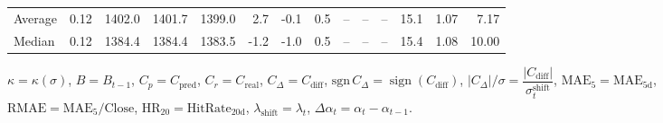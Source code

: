 \begin{threeparttable}
{\begin{tabular}{lrrrrrrrrrrrrr}
Average &     0.12 & 1402.0 & 1401.7 & 1399.0 &        2.7 &                     -0.1 &                 0.5 &         -- &        -- &             -- &             15.1 &            1.07 &                   7.17 \\
 Median &     0.12 & 1384.4 & 1384.4 & 1383.5 &       -1.2 &                     -1.0 &                 0.5 &         -- &        -- &             -- &             15.4 &            1.08 &                  10.00 \\
\bottomrule
\end{tabular}
}
\begin{tablenotes}\footnotesize
\item $\kappa=\kappa(\sigma)$, $B=B_{t-1}$, $C_p=C_{\text{pred}}$, $C_r=C_{\text{real}}$, $C_\Delta=C_{\text{diff}}$, $\mathrm{sgn}\,C_\Delta=\operatorname{sign}(C_{\text{diff}})$, $|C_\Delta|/\sigma=\dfrac{|C_{\text{diff}}|}{\sigma_t^{\text{shift}}}$, $\mathrm{MAE}_5=\mathrm{MAE}_{5\text{d}}$, $\mathrm{RMAE}= \mathrm{MAE}_5 / \text{Close}$, $\mathrm{HR}_{20}=\mathrm{HitRate}_{20\text{d}}$, 
$\lambda_{\text{shift}}=\lambda_t$, 
$\Delta\alpha_t=\alpha_t-\alpha_{t-1}$.
\end{tablenotes}
\end{threeparttable}
\endgroup

